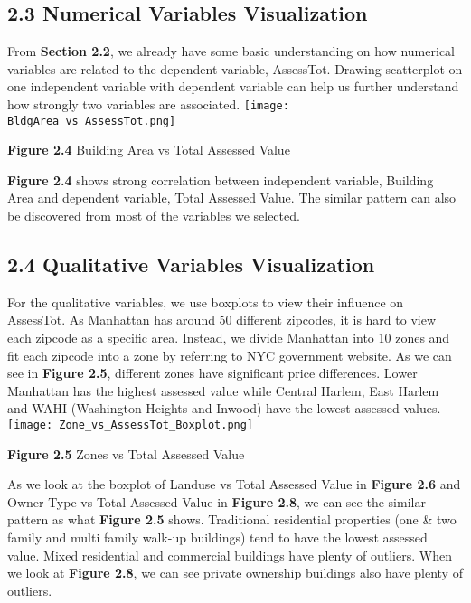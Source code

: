 \documentclass[9pt,twocolumn,twoside]{pnas-new}
\begin{document}
\subsection*{2.3 Numerical Variables Visualization}
From \textbf{Section 2.2}, we already have some basic understanding on how numerical variables are related to the dependent variable, AssessTot. Drawing scatterplot on one independent variable with dependent variable can help us further understand how strongly two variables are associated.
\texttt{[image: BldgArea\_vs\_AssessTot.png]} 
\begin{center}
\textbf{Figure 2.4} Building Area vs Total Assessed Value 
\end{center}

\noindent \textbf{Figure 2.4} shows strong correlation between independent variable, Building Area and dependent variable, Total Assessed Value. The similar pattern can also be discovered from most of the variables we selected.

\subsection*{2.4 Qualitative Variables Visualization}
For the qualitative variables, we use boxplots to view their influence on AssessTot. As Manhattan has around 50 different zipcodes, it is hard to view each zipcode as a specific area. Instead, we divide Manhattan into 10 zones and fit each zipcode into a zone by referring to NYC government website. As we can see in \textbf{Figure 2.5}, different zones have significant price differences. Lower Manhattan has the highest assessed value while Central Harlem, East Harlem and WAHI (Washington Heights and Inwood) have the lowest assessed values.
\texttt{[image: Zone\_vs\_AssessTot\_Boxplot.png]} 
\begin{center}
\textbf{Figure 2.5} Zones vs Total Assessed Value 
\end{center}
As we look at the boxplot of Landuse vs Total Assessed Value in \textbf{Figure 2.6} and Owner Type vs Total Assessed Value in \textbf{Figure 2.8}, we can see the similar pattern as what \textbf{Figure 2.5} shows. Traditional residential properties (one \& two family and multi family walk-up buildings) tend to have the lowest assessed value. Mixed residential and commercial buildings have plenty of outliers. When we look at \textbf{Figure 2.8}, we can see private ownership buildings also have plenty of outliers.
\end{document}
